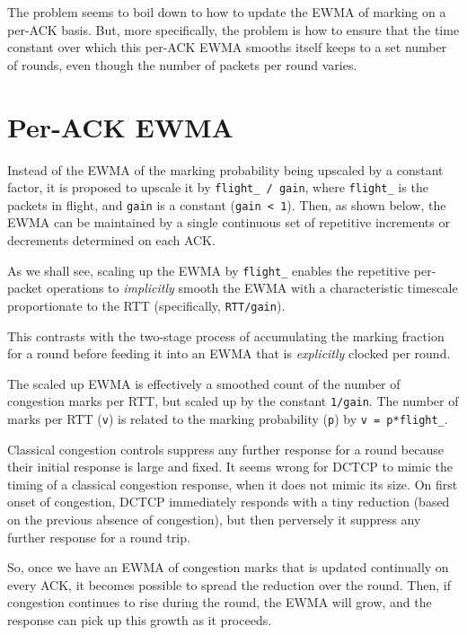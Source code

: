 The problem seems to boil down to how to update the EWMA of marking on a per-ACK basis. But, more specifically, the problem is how to ensure that the time constant over which this per-ACK EWMA smooths itself keeps to a set number of rounds, even though the number of packets per round varies.

\section{Per-ACK EWMA}\label{prresp_Per-Packet_EWMA}

Instead of the EWMA of the marking probability being upscaled by a constant factor, it is proposed to upscale it by \texttt{flight\_ / gain}, where \texttt{flight\_} is the packets in flight, and \texttt{gain} is a constant (\texttt{gain < 1}). Then, as shown below, the EWMA can be maintained by a single continuous set of repetitive increments or decrements determined on each ACK.

As we shall see, scaling up the EWMA by \texttt{flight\_} enables the repetitive per-packet operations to \emph{implicitly} smooth the EWMA with a characteristic timescale proportionate to the RTT (specifically, \texttt{RTT/gain}).

This contrasts with the two-stage process of accumulating the marking fraction for a round before feeding it into an EWMA that is \emph{explicitly} clocked per round.

The scaled up EWMA is effectively a smoothed count of the number of congestion marks per RTT, but scaled up by the constant \texttt{1/gain}. The number of marks per RTT (\texttt{v}) is related to the marking probability (\texttt{p}) by \texttt{v = p*flight\_}.

Classical congestion controls suppress any further response for a round because their initial response is large and fixed. It seems wrong for DCTCP to mimic the timing of a classical congestion response, when it does not mimic its size. On first onset of congestion, DCTCP immediately responds with a tiny reduction (based on the previous absence of congestion), but then perversely it suppress any further response for a round trip. 

So, once we have an EWMA of congestion marks that is updated continually on every ACK, it becomes possible to spread the reduction over the round. Then,  if congestion continues to rise during the round, the EWMA will grow, and the response can pick up this growth as it proceeds.

